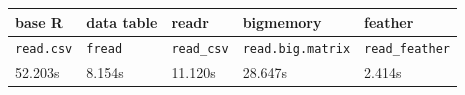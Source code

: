 \documentclass[]{article}
\begin{document}
\begin{longtable}[c]{@{}lllll@{}}
\toprule
\begin{minipage}[b]{0.05\columnwidth}\raggedright\strut
\textbf{base R}
\strut\end{minipage} &
\begin{minipage}[b]{0.05\columnwidth}\raggedright\strut
\textbf{data table}
\strut\end{minipage} &
\begin{minipage}[b]{0.05\columnwidth}\raggedright\strut
\textbf{readr}
\strut\end{minipage} &
\begin{minipage}[b]{0.05\columnwidth}\raggedright\strut
\textbf{bigmemory}
\strut\end{minipage} &
\begin{minipage}[b]{0.05\columnwidth}\raggedright\strut
\textbf{feather}
\strut\end{minipage}\tabularnewline
\midrule
\endhead
\begin{minipage}[t]{0.05\columnwidth}\raggedright\strut
\texttt{read.csv}
\strut\end{minipage} &
\begin{minipage}[t]{0.05\columnwidth}\raggedright\strut
\texttt{fread}
\strut\end{minipage} &
\begin{minipage}[t]{0.05\columnwidth}\raggedright\strut
\texttt{read\_csv}
\strut\end{minipage} &
\begin{minipage}[t]{0.05\columnwidth}\raggedright\strut
\texttt{read.big.matrix}
\strut\end{minipage} &
\begin{minipage}[t]{0.05\columnwidth}\raggedright\strut
\texttt{read\_feather}
\strut\end{minipage}\tabularnewline
\begin{minipage}[t]{0.05\columnwidth}\raggedright\strut
52.203s
\strut\end{minipage} &
\begin{minipage}[t]{0.05\columnwidth}\raggedright\strut
8.154s
\strut\end{minipage} &
\begin{minipage}[t]{0.05\columnwidth}\raggedright\strut
11.120s
\strut\end{minipage} &
\begin{minipage}[t]{0.05\columnwidth}\raggedright\strut
28.647s
\strut\end{minipage} &
\begin{minipage}[t]{0.05\columnwidth}\raggedright\strut
2.414s
\strut\end{minipage}\tabularnewline
\bottomrule
\end{longtable}
\end{document}
